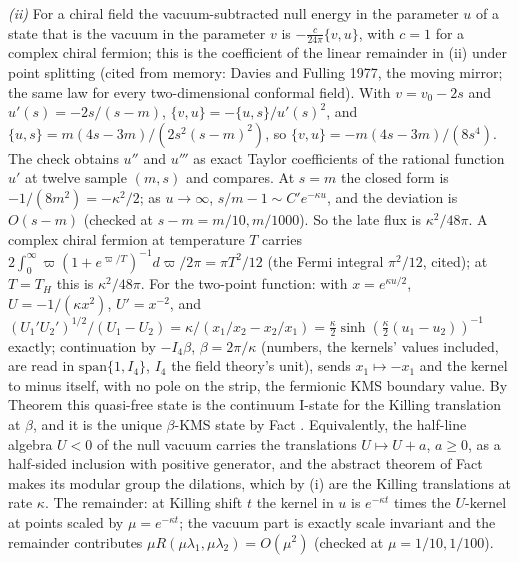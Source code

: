 \emph{(ii)} For a chiral field the vacuum-subtracted null energy in the parameter $u$ of a state that is the vacuum in the parameter $v$ is $-\tfrac{c}{24\pi}\{v, u\}$, with $c = 1$ for a complex chiral fermion; this is the coefficient of the linear remainder in (ii) under point splitting (cited from memory: Davies and Fulling 1977, the moving mirror; the same law for every two-dimensional conformal field). With $v = v_{0} - 2s$ and $u'(s) = -2s/(s - m)$, $\{v, u\} = -\{u, s\}/u'(s)^{2}$, and $\{u, s\} = m(4s - 3m)/(2s^{2}(s - m)^{2})$, so $\{v, u\} = -m(4s - 3m)/(8s^{4})$. The check obtains $u''$ and $u'''$ as exact Taylor coefficients of the rational function $u'$ at twelve sample $(m, s)$ and compares. At $s = m$ the closed form is $-1/(8m^{2}) = -\kappa^{2}/2$; as $u \to \infty$, $s/m - 1 \sim C'e^{-\kappa u}$, and the deviation is $O(s - m)$ (checked at $s - m = m/10, m/1000$). So the late flux is $\kappa^{2}/48\pi$. A complex chiral fermion at temperature $T$ carries $2\int_{0}^{\infty}\varpi(1 + e^{\varpi/T})^{-1}d\varpi/2\pi = \pi T^{2}/12$ (the Fermi integral $\pi^{2}/12$, cited); at $T = T_{H}$ this is $\kappa^{2}/48\pi$. For the two-point function: with $x = e^{\kappa u/2}$, $U = -1/(\kappa x^{2})$, $U' = x^{-2}$, and $(U_{1}'U_{2}')^{1/2}/(U_{1} - U_{2}) = \kappa/(x_{1}/x_{2} - x_{2}/x_{1}) = \tfrac{\kappa}{2}\sinh(\tfrac{\kappa}{2}(u_{1} - u_{2}))^{-1}$ exactly; continuation by $-I_{4}\beta$, $\beta = 2\pi/\kappa$ (numbers, the kernels' values included, are read in $\mathrm{span}\{1, I_{4}\}$, $I_{4}$ the field theory's unit), sends $x_{1} \mapsto -x_{1}$ and the kernel to minus itself, with no pole on the strip, the fermionic KMS boundary value. By Theorem  this quasi-free state is the continuum I-state for the Killing translation at $\beta$, and it is the unique $\beta$-KMS state by Fact . Equivalently, the half-line algebra $U < 0$ of the null vacuum carries the translations $U \mapsto U + a$, $a \ge 0$, as a half-sided inclusion with positive generator, and the abstract theorem of Fact  makes its modular group the dilations, which by (i) are the Killing translations at rate $\kappa$. The remainder: at Killing shift $t$ the kernel in $u$ is $e^{-\kappa t}$ times the $U$-kernel at points scaled by $\mu = e^{-\kappa t}$; the vacuum part is exactly scale invariant and the remainder contributes $\mu R(\mu\lambda_{1}, \mu\lambda_{2}) = O(\mu^{2})$ (checked at $\mu = 1/10, 1/100$).

